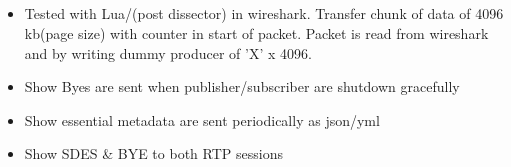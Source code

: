 \subsection{}

\begin{itemize}
	\item Tested with Lua/(post dissector) in wireshark. Transfer chunk of data of 4096 kb(page size) with counter in start of packet. Packet is read from wireshark and by writing dummy producer of 'X' x 4096.

	\item Show Byes are sent when publisher/subscriber are shutdown gracefully

	\item Show essential metadata are sent periodically as json/yml
	\item Show SDES \& BYE to both RTP sessions
	
\end{itemize}
